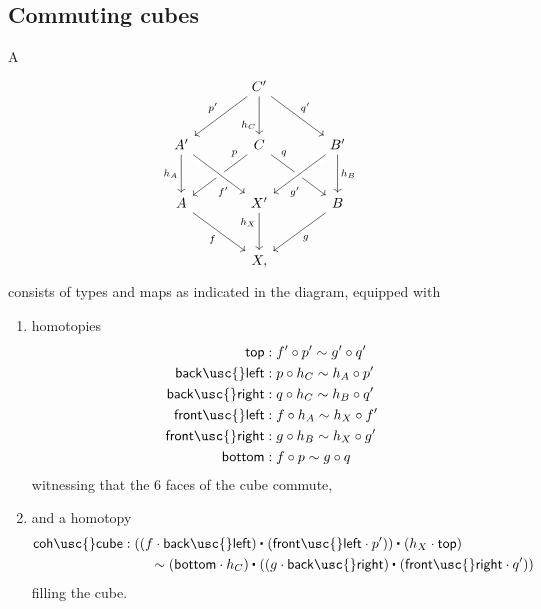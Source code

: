 \subsection{Commuting cubes}
\begin{defn}\label{defn:cube}
A 
\begin{equation*}
\begin{tikzcd}[column sep=large,row sep=large]
& C' \arrow[dl,swap,"{p'}"] \arrow[dr,"{q'}"] \arrow[d,swap,"{h_C}" near end] \\
A' \arrow[d,swap,"{h_A}"] & C \arrow[dl,swap,"{p}" very near start] \arrow[dr,"{q}" very near start] & B' \arrow[dl,crossing over,"{g'}" near end] \arrow[d,"{h_B}"] \\
A \arrow[dr,swap,"f"] & X' \arrow[d,swap,"{h_X}" near start] \arrow[from=ul,crossing over,swap,"{f'}" near end] & B \arrow[dl,"{g}"] \\
& X,
\end{tikzcd}
\end{equation*}
consists of types and maps as indicated in the diagram, equipped with
\begin{enumerate}
\item homotopies
  \begin{align*}
    \mathsf{top} & : f' \circ p' \htpy g' \circ q' \\
    \mathsf{back\usc{}left} & : p \circ h_C \htpy h_A \circ p' \\
    \mathsf{back\usc{}right} & : q \circ h_C \htpy h_B \circ q' \\
    \mathsf{front\usc{}left} & : f \circ h_A \htpy h_X \circ f' \\
    \mathsf{front\usc{}right} & : g \circ h_B \htpy h_X \circ g' \\
    \mathsf{bottom} & : f \circ p \htpy g \circ q
  \end{align*}
  witnessing that the 6 faces of the cube commute,
\item and a homotopy 
  \begin{align*}
\mathsf{coh\usc{}cube} & : \ct{(\ct{(f \cdot \mathsf{back\usc{}left})}{(\mathsf{front\usc{}left}\cdot p')})}{(h_X \cdot \mathsf{top})} \\
& \qquad \htpy \ct{(\mathsf{bottom}\cdot h_C)}{(\ct{(g \cdot \mathsf{back\usc{}right})}{(\mathsf{front\usc{}right}\cdot q')})}
\end{align*}
filling the cube.
\end{enumerate}
\end{defn}


